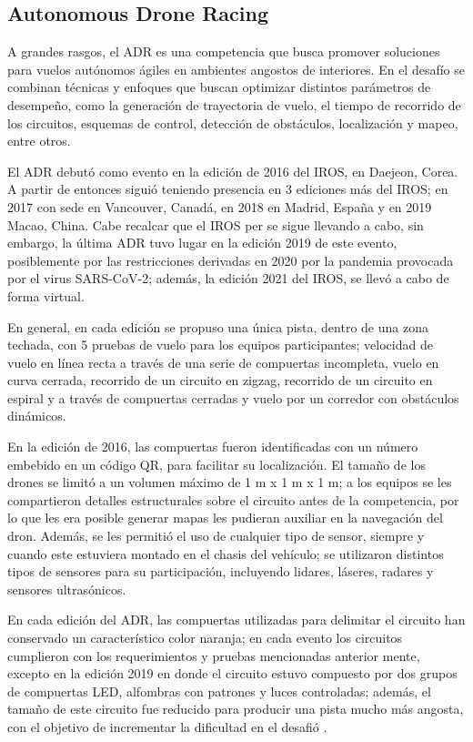 \subsection{Autonomous Drone Racing}
A grandes rasgos, el ADR es una competencia que busca promover soluciones para vuelos autónomos ágiles en ambientes angostos de interiores. En el desafío se combinan técnicas y enfoques que buscan optimizar distintos parámetros de desempeño, como la generación de trayectoria de vuelo, el tiempo de recorrido de los circuitos, esquemas de control, detección de obstáculos, localización y mapeo, entre otros. 

El ADR debutó como evento en la edición de 2016 del IROS, en Daejeon, Corea. A partir de entonces siguió teniendo presencia en 3 ediciones más del IROS; en 2017 con sede en Vancouver, Canadá, en 2018 en Madrid, España y en 2019 Macao, China. Cabe recalcar que el IROS per se sigue llevando a cabo, sin embargo, la última ADR tuvo lugar en la edición 2019 de este evento, posiblemente por las restricciones derivadas en 2020 por la pandemia provocada por el virus SARS-CoV-2; además, la edición 2021 del IROS, se llevó a cabo de forma virtual.  

En general, en cada edición se propuso una única pista, dentro de una zona techada, con 5 pruebas de vuelo para los equipos participantes; velocidad de vuelo en línea recta a través de una serie de compuertas incompleta, vuelo en curva cerrada, recorrido de un circuito en zigzag, recorrido de un circuito en espiral y a través de compuertas cerradas y vuelo por un corredor con obstáculos dinámicos. 

En la edición de 2016, las compuertas fueron identificadas con un número embebido en un código QR, para facilitar su localización. El tamaño de los drones se limitó a un volumen máximo de  1 m x 1 m x 1 m; a los equipos se les compartieron detalles estructurales sobre el circuito antes de la competencia, por lo que les era posible generar mapas les pudieran auxiliar en la navegación del dron. Además, se les permitió el uso de cualquier tipo de sensor, siempre y cuando este estuviera montado en el chasis del vehículo; se utilizaron distintos tipos de sensores para su participación, incluyendo lidares, láseres, radares y sensores ultrasónicos.

En cada edición del ADR, las compuertas utilizadas para delimitar el circuito han conservado un característico color naranja; en cada evento los circuitos cumplieron con los requerimientos y pruebas mencionadas anterior mente, excepto en la edición 2019 en donde el circuito estuvo compuesto por dos grupos de compuertas LED, alfombras con patrones y luces controladas; además, el tamaño de este circuito fue reducido para producir una pista mucho más angosta, con el objetivo de incrementar la dificultad en el desafió \cite{rojas2021board}.   

